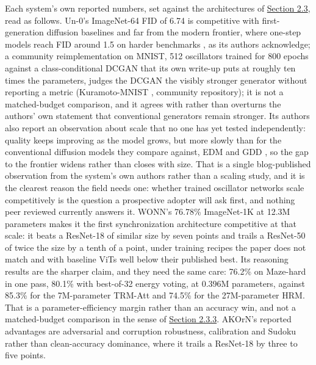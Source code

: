 \documentclass[10pt]{article}
\begin{document}
Each system's own reported numbers, set against the architectures of
\hyperref[sec-2-3]{Section 2.3}, read as follows. Un-0's ImageNet-64 FID
of 6.74 is competitive with first-generation diffusion baselines and far
from the modern frontier, where one-step models reach FID around 1.5 on
harder benchmarks \citep{deng2026}, as its authors acknowledge; a
community reimplementation on MNIST, 512 oscillators trained for 800
epochs against a class-conditional DCGAN that its own write-up puts at
roughly ten times the parameters, judges the DCGAN the visibly stronger
generator without reporting a metric (Kuramoto-MNIST
\citep{kuramoto-mnist}, community repository); it is not a
matched-budget comparison, and it agrees with rather than overturns the
authors' own statement that conventional generators remain stronger. Its
authors also report an observation about scale that no one has yet
tested independently: quality keeps improving as the model grows, but
more slowly than for the conventional diffusion models they compare
against, EDM \citep{edm} and GDD \citep{gdd}, so the gap to the frontier
widens rather than closes with size. That is a single blog-published
observation from the system's own authors rather than a scaling study,
and it is the clearest reason the field needs one: whether trained
oscillator networks scale competitively is the question a prospective
adopter will ask first, and nothing peer reviewed currently answers it.
WONN's 76.78\% ImageNet-1K at 12.3M parameters makes it the first
synchronization architecture competitive at that scale: it beats a
ResNet-18 of similar size by seven points and trails a ResNet-50 of
twice the size by a tenth of a point, under training recipes the paper
does not match and with baseline ViTs well below their published best.
Its reasoning results are the sharper claim, and they need the same
care: 76.2\% on Maze-hard in one pass, 80.1\% with best-of-32 energy
voting, at 0.396M parameters, against 85.3\% for the 7M-parameter
TRM-Att and 74.5\% for the 27M-parameter HRM. That is a
parameter-efficiency margin rather than an accuracy win, and not a
matched-budget comparison in the sense of \hyperref[sec-2-3-3]{Section
2.3.3}. AKOrN's reported advantages are adversarial and corruption
robustness, calibration and Sudoku rather than clean-accuracy dominance,
where it trails a ResNet-18 by three to five points.
\end{document}
